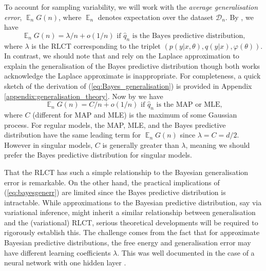 \documentclass[11pt]{article}
\DeclareMathOperator*{\E}{\operatorname{\mathbb{E}}}
\numberwithin{equation}{section}
\theoremstyle{plain}
\theoremstyle{definition}
\begin{document}
To account for sampling variability, we will work with the \textit{average generalisation error}, ${\E}_n G(n)$, where ${\E}_n$ denotes expectation over the dataset $\mathcal D_n$.
By {\citet[Theorem 1.2 and Theorem 7.2]{watanabe_algebraic_2009}}, we have
\begin{equation}
	{\E}_n G(n) = \lambda/n + o(1/n)  \text{ if $\hat q_n$ is the Bayes predictive distribution,}
	\label{eq:Bayes_generalisation}
\end{equation}
where $\lambda$ is the RLCT corresponding to the triplet $( p(y|x,\theta), q(y|x), \varphi(\theta) )$. In contrast, we should note that \citet{zhang_energyentropy_2018} and  \citet{smith2017bayesian} rely on the Laplace approximation to explain the generalisation of the Bayes predictive distribution though both works acknowledge the Laplace approximate is inappropriate. For completeness, a quick sketch of the derivation of (\ref{eq:Bayes_generalisation}) is provided in Appendix \ref{appendix:generalisation_theory}.
Now by {\cite[Theorem 6.4]{watanabe_algebraic_2009}} we have
\begin{equation}
	{\E}_n G(n) = C/n + o(1/n)   \text{ if $\hat q_n$ is the MAP or MLE,}
	\label{eq:map_generalisation}
\end{equation}
where $C$ (different for MAP and MLE) is the maximum of some Gaussian process. For regular models, the MAP, MLE, and the Bayes predictive distribution have the same leading term for ${\E}_n G(n)$ since $\lambda = C = d/2$. However in singular models, $C$ is generally greater than $\lambda$, meaning we should prefer the Bayes predictive distribution for singular models.

That the RLCT has such a simple relationship to the Bayesian generalisation error is remarkable. On the other hand, the practical implications of (\ref{eq:bayesgenerr}) are limited since the Bayes predictive distribution is intractable. While approximations to the Bayesian predictive distribution, say via variational inference, might inherit a similar relationship between generalisation and the (variational) RLCT, serious theoretical developments will be required to rigorously establish this. The challenge comes from the fact that for approximate Bayesian predictive distributions, the free energy and generalisation error may have different learning coefficients $\lambda$. This was well documented in the case of a neural network with one hidden layer \citep{nakajima_variational_2007}.  
\end{document}
